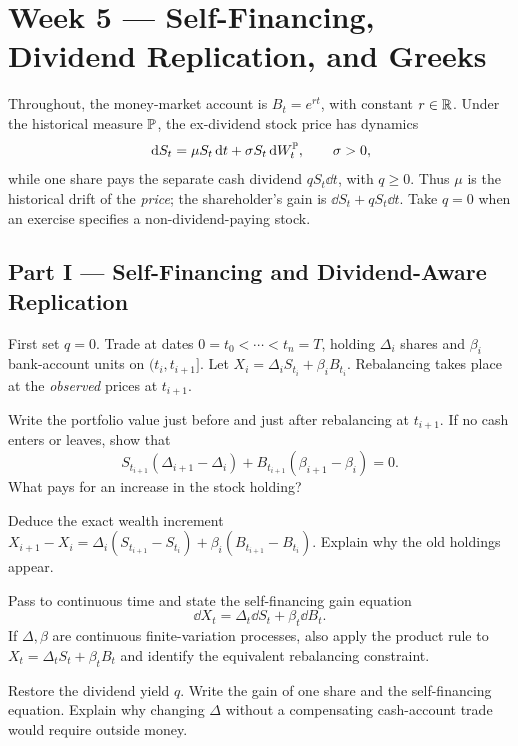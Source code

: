 \section{Week 5 --- Self-Financing, Dividend Replication, and Greeks}

Throughout, the money-market account is \(B_t=e^{rt}\), with constant
\(r\in\mathbb{R}\). Under the historical measure \(\mathbb{P}\), the ex-dividend stock
price has dynamics
\[
\,\mathrm{d} S_t=\mu S_t\,\mathrm{d} t+\sigma S_t\,\mathrm{d} W_t^{\mathbb{P}},
\qquad \sigma>0,
\]
while one share pays the separate cash dividend \(qS_t\dd t\), with
\(q\geq0\). Thus \(\mu\) is the historical drift of the \emph{price}; the
shareholder's gain is \(\dd S_t+qS_t\dd t\). Take \(q=0\) when an exercise
specifies a non-dividend-paying stock.

\subsection*{Part I --- Self-Financing and Dividend-Aware Replication}

\begin{exercise}
First set \(q=0\). Trade at dates \(0=t_0<\cdots<t_n=T\), holding
\(\Delta_i\) shares and \(\beta_i\) bank-account units on
\((t_i,t_{i+1}]\). Let \(X_i=\Delta_iS_{t_i}+\beta_iB_{t_i}\).
Rebalancing takes place at the \emph{observed} prices at \(t_{i+1}\).
\begin{exparts}
  \item Write the portfolio value just before and just after rebalancing at
  \(t_{i+1}\). If no cash enters or leaves, show that
  \[
  S_{t_{i+1}}(\Delta_{i+1}-\Delta_i)
  +B_{t_{i+1}}(\beta_{i+1}-\beta_i)=0.
  \]
  What pays for an increase in the stock holding?
  \item Deduce the exact wealth increment
  \(X_{i+1}-X_i=\Delta_i(S_{t_{i+1}}-S_{t_i})
  +\beta_i(B_{t_{i+1}}-B_{t_i})\). Explain why the old holdings appear.
  \item Pass to continuous time and state the self-financing gain equation
  \[
  \dd X_t=\Delta_t\dd S_t+\beta_t\dd B_t.
  \]
  If \(\Delta,\beta\) are continuous finite-variation processes, also
  apply the product rule to \(X_t=\Delta_tS_t+\beta_tB_t\) and identify
  the equivalent rebalancing constraint.
  \item Restore the dividend yield \(q\). Write the gain of one share and
  the self-financing equation. Explain why changing \(\Delta\) without a
  compensating cash-account trade would require outside money.
\end{exparts}
\end{exercise}

